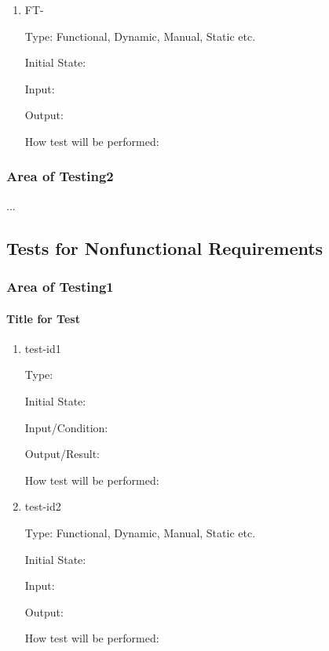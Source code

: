 \documentclass[12pt, titlepage]{article}
\newcounter{ftnum} %
\begin{document}
\begin{enumerate}
\item{FT-\theftnum \label{ft-}}

Type: Functional, Dynamic, Manual, Static etc. %
					
Initial State: 
					
Input: 
					
Output: 
					
How test will be performed: 

\end{enumerate}

\subsubsection{Area of Testing2}

...

\subsection{Tests for Nonfunctional Requirements}

\subsubsection{Area of Testing1}
		
\paragraph{Title for Test}

\begin{enumerate}

\item{test-id1\\}

Type: 
					
Initial State: 
					
Input/Condition: 
					
Output/Result: 
					
How test will be performed: 
					
\item{test-id2\\}

Type: Functional, Dynamic, Manual, Static etc.
					
Initial State: 
					
Input: 
					
Output: 
					
How test will be performed: 

\end{enumerate}
\end{document}
